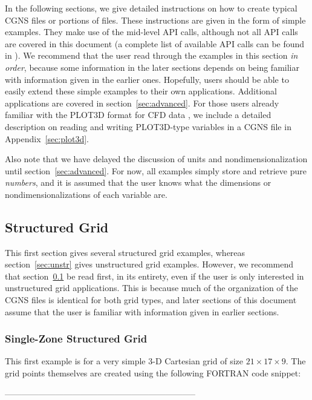 \documentclass[12pt]{article}
\begin{document}
In the following sections, we give detailed instructions on
how to create typical CGNS files or portions of files.  These 
instructions are
given in the form of simple examples.  They make use of the 
mid-level API calls, although not all API calls are covered in
this document (a complete list of available API calls can be
found in \cite{POIRIER99}).  We recommend that the user
read through the examples in this section {\it in order}, because some
information in the later sections depends on being
familiar with information given in the earlier ones.  Hopefully, 
users should be able to easily
extend these simple examples to their own applications.
Additional applications are covered in 
section~\ref{sec:advanced}.  For those users already familiar with
the PLOT3D format for CFD data \cite{WALATKA}, we include a detailed description
on reading and writing PLOT3D-type variables in a CGNS file in
Appendix~\ref{sec:plot3d}.

Also note that we have delayed the discussion
of units and nondimensionalization until section~\ref{sec:advanced}.
For now, all examples simply store and retrieve pure {\it numbers},
and it is assumed that the user knows what the dimensions or
nondimensionalizations of each variable are.

\newpage
\subsection{Structured Grid} \label{sec:str}

This first section gives several structured grid examples, whereas
section~\ref{sec:unstr} gives unstructured grid examples.  However,
we recommend that section~\ref{sec:str} be read first, in its entirety,
even if the user is only interested in unstructured grid
applications.  This is because much of the organization of the
CGNS files is identical for both grid types, and later sections
of this document assume that the user is familiar with information
given in earlier sections.

\subsubsection{Single-Zone Structured Grid} \label{sec:singlegrid}

This first example is for a very simple 3-D Cartesian grid of size
$21 \times 17 \times 9$.  The grid points themselves are created
using the following FORTRAN code snippet:

--------------------------------------------------------------------
\end{document}
